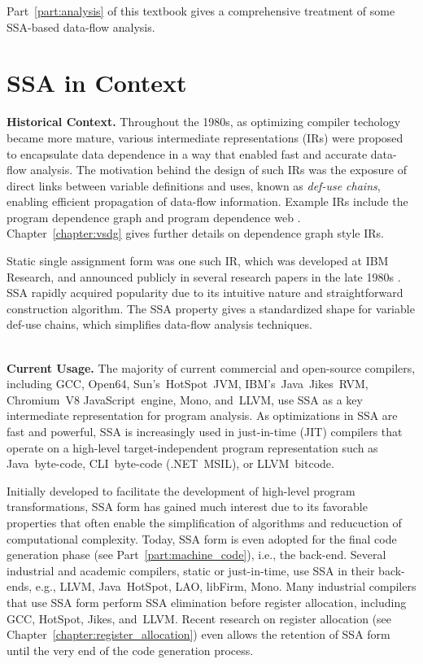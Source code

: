 Part~\ref{part:analysis} of this textbook gives a comprehensive treatment of some SSA-based data-flow analysis.




\section{SSA in Context}

\textbf{Historical Context.}
Throughout the 1980s, as optimizing compiler techology became more mature, various intermediate representations (IRs) were proposed to encapsulate data dependence in a way that enabled fast and accurate data-flow analysis. 
The motivation behind the design of such IRs was the exposure of direct links between variable definitions and uses, known as \textit{def-use chains}, enabling efficient propagation of data-flow information. 
Example IRs include the program dependence graph \cite{ferrante87program} and program dependence web \cite{ottenstein90program}. 
Chapter~\ref{chapter:vsdg} gives further details on dependence graph style IRs.

Static single assignment form was one such IR, which was developed at IBM Research, and announced publicly in several research papers in the late 1980s \cite{rosen88global,alpern88detecting,cytron89efficient}. 
SSA rapidly acquired popularity due to its intuitive nature and straightforward construction algorithm. 
The SSA property gives a standardized shape for variable def-use chains, which simplifies data-flow analysis techniques.

~\\ \textbf{Current Usage.}
The majority of current commercial and open-source compilers, including GCC, Open64, Sun's~HotSpot~JVM, IBM's~Java~Jikes~RVM, Chromium~V8 JavaScript~engine, Mono, and~LLVM, use SSA as a key intermediate representation for program analysis. 
As optimizations in SSA are fast and powerful, SSA is increasingly used in just-in-time (JIT) compilers that operate on a high-level target-independent program representation such as Java~byte-code, CLI~byte-code (.NET~MSIL), or LLVM~bitcode.



Initially developed to facilitate the development of high-level program transformations, SSA form has gained much interest due to its favorable properties that often enable the simplification of algorithms and reducuction of computational complexity. 
Today, SSA form is even adopted for the final code generation phase (see Part~\ref{part:machine_code}), i.e., the back-end. 
Several industrial and academic compilers, static or just-in-time, use SSA in their back-ends, e.g., LLVM, Java~HotSpot, LAO, libFirm, Mono. 
Many industrial compilers that use SSA form perform SSA elimination before register allocation, including GCC, HotSpot, Jikes, and~LLVM. 
Recent research on register allocation (see Chapter~\ref{chapter:register_allocation}) even allows the retention of SSA form until the very end of the code generation process.

